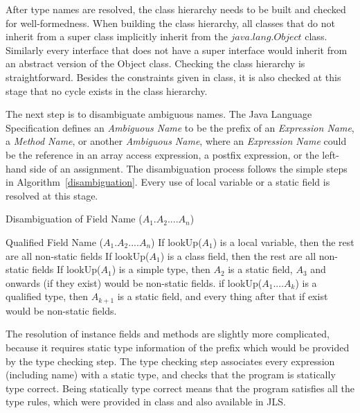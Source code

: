 \documentclass[a4paper, notitlepage]{report}
\begin{document}
After type names are resolved, the class hierarchy needs to be built and checked for well-formedness. When building the class hierarchy, all classes that do not inherit from a super class implicitly inherit from the $java.lang.Object$ class. Similarly every interface that does not have a super interface would inherit from an abstract version of the Object class. Checking the class hierarchy is straightforward. Besides the constraints given in class, it is also checked at this stage that no cycle exists in the class hierarchy.

The next step is to disambiguate ambiguous names. The Java Language Specification defines an \emph{Ambiguous Name} to be the prefix of an \emph{Expression Name}, a \emph{Method Name}, or another \emph{Ambiguous Name}, where an \emph{Expression Name} could be the reference in an array access expression, a postfix expression, or the left-hand side of an assignment. The disambiguation process follows the simple steps in Algorithm~\ref{disambiguation}. Every use of local variable or a static field is resolved at this stage.

\begin{algorithm}                      %
\caption{Disambiguation of Field Name ($A_1.A_2....A_n$)}          %
\label{disambiguation}                           %
\begin{algorithmic}[1]
\Require Qualified Field Name ($A_1.A_2....A_n$)
\State If lookUp($A_1$) is a local variable, then the rest are all non-static fields 
\State If lookUp($A_1$) is a  class field, then the rest are all non-static fields
\State If lookUp($A_1$) is a simple type, then $A_2$ is a static field, $A_3$ and onwards (if they exist) would be non-static fields.
\State if lookUp($A_1....A_k$) is a qualified type, then $A_{k+1}$ is a static field, and every thing after that if exist would be non-static fields.

\end{algorithmic}
\end{algorithm}

The resolution of instance fields and methods are slightly more complicated, because it requires static type information of the prefix which would be provided by the type checking step. The type checking step associates every expression (including name) with a static type, and checks that the program is statically type correct. Being statically type correct means that the program satisfies all the type rules, which were provided in class and also available in JLS. 
\end{document}
